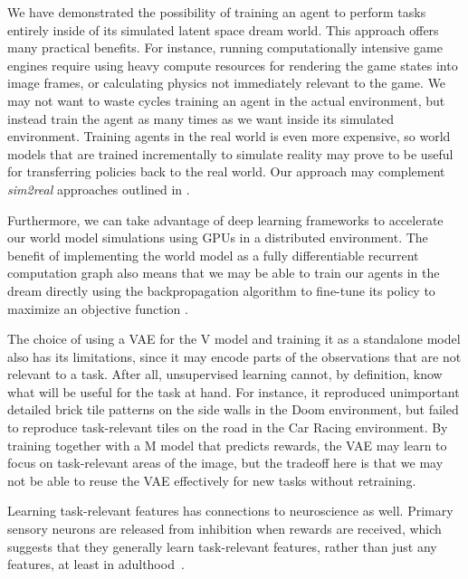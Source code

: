 \documentclass{article}
\begin{document}
We have demonstrated the possibility of training an agent to perform tasks entirely inside of its simulated latent space dream world. This approach offers many practical benefits. For instance, running computationally intensive game engines require using heavy compute resources for rendering the game states into image frames, or calculating physics not immediately relevant to the game. We may not want to waste cycles training an agent in the actual environment, but instead train the agent as many times as we want inside its simulated environment. Training agents in the real world is even more expensive, so world models that are trained incrementally to simulate reality may prove to be useful for transferring policies back to the real world. Our approach may complement \textit{sim2real} approaches outlined in \cite{Bousmalis2017,Higgins2017}.

Furthermore, we can take advantage of deep learning frameworks to accelerate our world model simulations using GPUs in a distributed environment. The benefit of implementing the world model as a fully differentiable recurrent computation graph also means that we may be able to train our agents in the dream directly using the backpropagation algorithm to fine-tune its policy to maximize an objective function \cite{s05_making_the_world_differentiable,s05a_cm,s05b_rl}.

The choice of using a VAE for the V model and training it as a standalone model also has its limitations, since it may encode parts of the observations that are not relevant to a task. After all, unsupervised learning cannot, by definition, know what will be useful for the task at hand. For instance, it reproduced unimportant detailed brick tile patterns on the side walls in the Doom environment, but failed to reproduce task-relevant tiles on the road in the Car Racing environment. By training together with a M model that predicts rewards, the VAE may learn to focus on task-relevant areas of the image, but the tradeoff here is that we may not be able to reuse the VAE effectively for new tasks without retraining.

Learning task-relevant features has connections to neuroscience as well. Primary sensory neurons are released from inhibition when rewards are received, which suggests that they generally learn task-relevant features, rather than just any features, at least in adulthood~\cite{Pi2013}.

\end{document}
